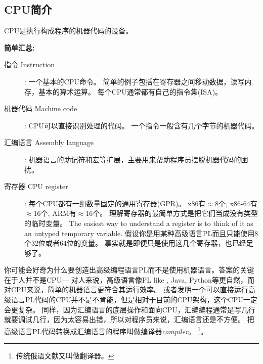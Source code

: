 \documentclass[UTF8,nofonts]{ctexart}
\begin{document}

\subsection{CPU简介}

\ac{CPU}是执行构成程序的机器代码的设备。

\textbf{简单汇总:}

\begin{description}
\item[指令 Instruction]: 一个基本的\ac{CPU}命令。
简单的例子包括在寄存器之间移动数据，读写内存，基本的算术运算。
每个\ac{CPU}通常都有自己的指令集(\ac{ISA})。

\item[机器代码 Machine code]: \ac{CPU}可以直接识别处理的代码。
一个指令一般含有几个字节的机器代码。
\item[汇编语言 Assembly language]: 机器语言的助记符和宏等扩展，主要用来帮助程序员摆脱机器代码的困扰。
\item[寄存器 CPU register]: 每个\ac{CPU}都有一组数量固定的通用寄存器(\ac{GPR})。
x86有$\approx 8$个, x86-64有$\approx 16$个, ARM有$\approx 16$个。
理解寄存器的最简单方式是把它们当成没有类型的临时变量。
The easiest way to understand a register is to think of it as an untyped temporary variable.
假设你是用某种高级语言\ac{PL}而且只能使用8个32位或者64位的变量。
事实就是即便只是使用这几个寄存器，也已经足够了。
\end{description}


你可能会好奇为什么要创造出高级编程语言\ac{PL}而不是使用机器语言。答案的关键在于人并不是\ac{CPU}---%
对人来说，高级语言像\ac{PL} like \CCpp, Java, Python等更自然，而对\ac{CPU}来说，简单的机器语言更符合其运行效率。
或者发明一个可以直接运行高级语言\ac{PL}代码的\ac{CPU}并不是不肯能，但是相对于目前的\ac{CPU}架构，这个\ac{CPU}一定会更复杂。
同样，因为汇编语言的底层操作和面向\ac{CPU}，汇编编程通常是写几行就要调试几行，因为太容易出错，所以对程序员来说，汇编语言还是不方便。
把高级语言\ac{PL}代码转换成汇编语言的程序叫做编译器\emph{compiler}。
\footnote{传统俄语文献又叫做翻译器。}。

%
%
%
\end{document}
